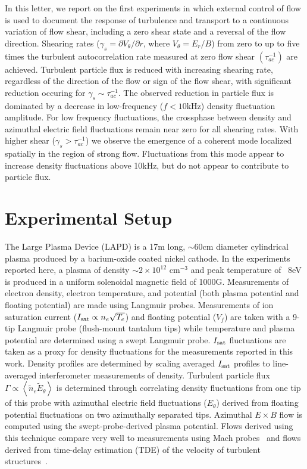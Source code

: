 \documentclass[aip,pop,amsmath,amssymb,preprint,superscriptaddress]{revtex4-1} %
\begin{document}
In this letter, we report on the first experiments in which external control of flow is used to document the response of turbulence and transport to a continuous variation of flow shear, including a zero shear state and a reversal of the flow direction. Shearing rates ($\gamma_{s}= \partial V_{\theta}/\partial r$, where $V_{\theta} = E_r/B$) from zero to up to five times the turbulent autocorrelation rate measured at zero flow shear $(\tau_{ac}^{-1})$ are achieved. Turbulent particle flux is reduced with increasing shearing rate, regardless of the direction of the flow or sign of the flow shear, with significant reduction occuring for $\gamma_{s} \sim \tau_{ac}^{-1}$.  The observed reduction in particle flux is dominated by a decrease in low-frequency ($f < 10$kHz) density fluctuation amplitude. For low frequency fluctuations, the crossphase between density and azimuthal electric field fluctuations remain near zero for all shearing rates.  With higher shear ($\gamma_{s} > \tau_{ac}^{-1}$) we observe the emergence of a coherent mode localized spatially in the region of strong flow. Fluctuations from this mode appear to increase density fluctuations above 10kHz, but do not appear to contribute to particle flux.   

\section{Experimental Setup}

The Large Plasma Device \cite{gek91} (LAPD) is a 17m long, $\sim$60cm diameter cylindrical plasma produced by a barium-oxide coated nickel
cathode. In the experiments reported here, a plasma of density $\sim$$2 \times 10^{12}$ cm$^{-3}$ and peak temperature of ~8eV is
produced in a uniform solenoidal magnetic field of 1000G.  Measurements of electron density, electron temperature, and potential (both plasma
potential and floating potential) are made using Langmuir probes.  
Measurements of ion saturation current ($I_{\rm sat} \propto n_e \sqrt{T_e}$) and floating
potential ($V_f$) are taken with a 9-tip Langmuir probe (flush-mount
tantalum tips) while temperature and plasma potential are
determined using a swept Langmuir probe. $I_{\rm sat}$ fluctuations are taken as a proxy for density fluctuations for the measurements reported in this work. Density profiles are determined by scaling averaged $I_{\rm sat}$ profiles to line-averaged interferometer measurements of density.  Turbulent particle flux
$\Gamma \propto \left<\tilde{n}_e \tilde{E}_\theta\right>$ is
determined through correlating density fluctuations from one tip
of this probe with
azimuthal electric field fluctuations ($E_\theta$) derived from
floating potential fluctuations on two azimuthally separated tips.
Azimuthal $E\times B$ flow is computed
using the swept-probe-derived plasma potential.  Flows derived using
this technique compare very well to measurements using
Mach probes~\cite{maggs07} and flows derived from time-delay
estimation (TDE) of the velocity of turbulent structures~\cite{holland04}.
  
\end{document}
